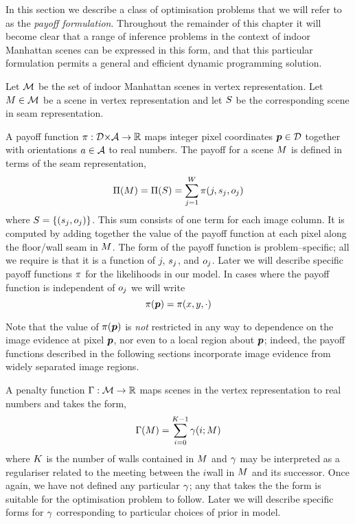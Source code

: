 In this section we describe a class of optimisation problems that we
will refer to as the \textit{payoff formulation}. Throughout the
remainder of this chapter it will become clear that a range of
inference problems in the context of indoor Manhattan scenes can be
expressed in this form, and that this particular formulation permits a
general and efficient dynamic programming solution.

Let $\SetOfScenes$ be the set of indoor Manhattan scenes in vertex
representation. Let $\Scene\in\SetOfScenes$ be a scene in vertex
representation and let $\Seam$ be the corresponding scene in
seam representation. 

A payoff function $\PixelPayoff: \Dom\cross\SetOfOrientations
\Mapto\Reals$ maps integer pixel coordinates $\Pixel\in\Dom$ together
with orientations $\Orient\in\SetOfOrientations$ to real numbers. The
payoff for a scene $\Scene$ is defined in terms of the seam
representation,
\begin{equation}
  \label{eq:scene-payoff}
  \ScenePayoff(\Scene) = 
  \ScenePayoff(\Seam) =
  \sum_{j=1}^{\Width} \PixelPayoff(j,\seam_j,\WallOrient_j)
\end{equation}
where $\Seam = \{(\seam_j,\WallOrient_j)\}$. This sum consists of one
term for each image column. It is computed by adding together the
value of the payoff function at each pixel along the floor/wall seam
in $\Scene$. The form of the payoff function is problem--specific; all
we require is that it is a function of $j$, $\seam_j$, and
$\WallOrient_j$. Later we will describe specific payoff functions
$\PixelPayoff$ for the likelihoods in our model. In cases where the
payoff function is independent of $\WallOrient_j$ we will write
\begin{equation}
  \PixelPayoff(\Pixel) = \PixelPayoff(x,y,\cdot)
\end{equation}

Note that the value of $\PixelPayoff(\Pixel)$ is \textit{not}
restricted in any way to dependence on the image evidence at pixel
$\Pixel$, nor even to a local region about $\Pixel$; indeed, the
payoff functions described in the following sections incorporate image
evidence from widely separated image regions.

A penalty function $\ScenePenalty:\SetOfScenes\Mapto\Reals$ maps
scenes in the vertex representation to real numbers and takes the form,
\begin{equation}
  \label{eq:scene-penalty}
  \ScenePenalty(\Scene) = 
  \sum_{i=0}^{\NumWalls-1} \CornerPenalty(i;\Scene)
\end{equation}
where $\NumWalls$ is the number of walls contained in $\Scene$ and
$\CornerPenalty$ may be interpreted as a regulariser related to the
meeting between the $i$\th wall in $\Scene$ and its successor. Once
again, we have not defined any particular $\CornerPenalty$; any that
takes the the form  is suitable for the
optimisation problem to follow. Later we will describe specific forms
for $\CornerPenalty$ corresponding to particular choices of prior in
model.

